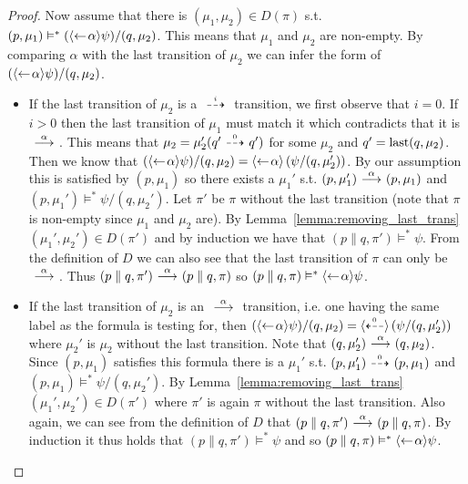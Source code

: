 \begin{proof}
    \rtl Now assume that there is $(\mu_1,\mu_2) \in D(\pi)$ s.t. $(p,\mu_1) \vDash^* (\mbox{\ensuremath{\langle\leftarrow\! 
    \alpha \rangle}}\psi)/(q,\mu_2)$. This means that $\mu_1$ and $\mu_2$ are non-empty. By comparing
    $\alpha$ with the last transition  of $\mu_2$ we can infer the form of $(\mbox{\ensuremath{\langle\leftarrow\! \alpha \rangle}}
    \psi) / (q,\mu_2)$.
    \begin{itemize}
        \item If the last transition of $\mu_2$ is a $\ {\stackrel{_{i}}{\dashrightarrow}}\ $ transition, we first
            observe that $i=0$. If $i>0$ then the last transition of $\mu_1$ must match
            it which contradicts that it is $\ {\stackrel{{\alpha}}{\longrightarrow}}\ $. This means that $\mu_2
            = \mu_2' (q' \ {\stackrel{_{0}}{\dashrightarrow}}\  q')$ for some $\mu_2$ and $q' = \operatorname{last}(q,\mu_2)$. Then
            we know that $(\mbox{\ensuremath{\langle\leftarrow\! \alpha \rangle}} \psi) / (q,\mu_2) = \mbox{\ensuremath{\langle\leftarrow\! \alpha \rangle}} \left(
            \psi / (q,\mu_2') \right)$. By our assumption this is satisfied by $(p,\mu_1)$
            so there exists a $\mu_1'$ s.t. $(p,\mu_1') \ {\stackrel{{\alpha}}{\longrightarrow}}\  (p,\mu_1)$ and
            $(p,\mu_1') \vDash^* \psi / (q,\mu_2')$. Let $\pi'$ be $\pi$ without the
            last transition (note that $\pi$ is non-empty since $\mu_1$ and $\mu_2$ are).
            By Lemma~\ref{lemma:removing_last_trans} $(\mu_1',\mu_2')\in D(\pi')$ and by
            induction we have that $(p\parallel q,\pi') \vDash^* \psi$. From the definition
            of $D$ we can also see that the last transition of $\pi$ can only be $\ {\stackrel{{\alpha}}{\longrightarrow}}\ $.
            Thus $(p\parallel q,\pi') \ {\stackrel{{\alpha}}{\longrightarrow}}\  (p\parallel q, \pi)$ so $(p\parallel q,\pi)
            \vDash^* \mbox{\ensuremath{\langle\leftarrow\! \alpha \rangle}}\psi$.
        \item If the last transition of $\mu_2$ is an $\ {\stackrel{{\alpha}}{\longrightarrow}}\ $ transition, i.e. one
            having the same label as the formula is testing for, then $(\mbox{\ensuremath{\langle\leftarrow\! \alpha \rangle}}\psi)
            /(q,\mu_2) = \mbox{\ensuremath{\langle\stackrel{_{0}}{\dashleftarrow}\rangle}}\left( \psi/(q,\mu_2') \right)$ where $\mu_2'$ is $\mu_2$
            without the last transition. Note that $(q,\mu_2')\ {\stackrel{{\alpha}}{\longrightarrow}}\ (q,\mu_2)$. Since
            $(p,\mu_1)$ satisfies this formula there is a $\mu_1'$ s.t. $(p,\mu_1')\ {\stackrel{_{0}}{\dashrightarrow}}\ 
            (p,\mu_1)$ and $(p,\mu_1) \vDash^* \psi/(q,\mu_2')$. By
            Lemma~\ref{lemma:removing_last_trans} $(\mu_1',\mu_2')\in D(\pi')$ where $\pi'$
            is again $\pi$ without the last transition. Also again, we can see from the
            definition of $D$ that $(p\parallel q,\pi')\ {\stackrel{{\alpha}}{\longrightarrow}}\ (p\parallel q,\pi)$.
            By induction it thus holds that $(p\parallel q, \pi')\vDash^* \psi$ and so
            $(p\parallel q,\pi) \vDash^* \mbox{\ensuremath{\langle\leftarrow\! \alpha \rangle}}\psi$.

\end{itemize}
\end{proof}
